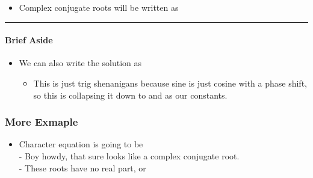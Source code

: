 \documentclass[
]{article}
\providecommand{\tightlist}{%
  \setlength{\itemsep}{0pt}\setlength{\parskip}{0pt}}
\begin{document}
\begin{itemize}
\tightlist
\item
  Complex conjugate roots {} will be written as {}
\end{itemize}

\begin{center}\rule{0.5\linewidth}{0.5pt}\end{center}

\paragraph{Brief Aside}\label{brief-aside}

\begin{itemize}
\tightlist
\item
  We can also write the solution as {}

  \begin{itemize}
  \tightlist
  \item
    This is just trig shenanigans because sine is just cosine with a
    phase shift, so this is collapsing it down to {} and {} as our
    constants.
  \end{itemize}
\end{itemize}

\subsubsection{More Exmaple}\label{more-exmaple}

\begin{itemize}
\tightlist
\item
  Character equation is going to be {}\\
  - Boy howdy, that sure looks like a complex conjugate root.\\
  - These roots have no real part, or {}
\end{itemize}
\end{document}
